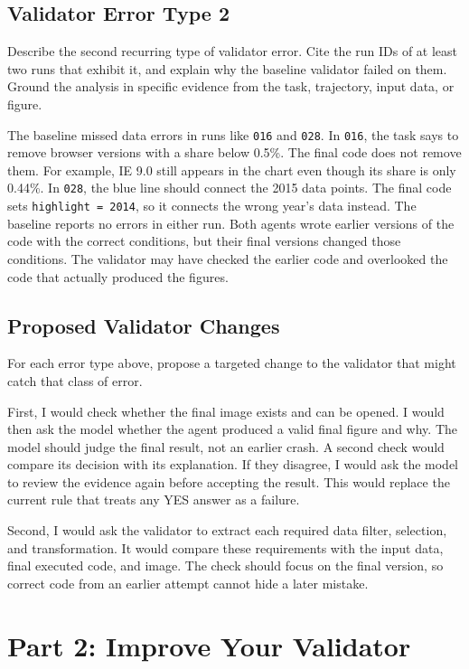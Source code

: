 \documentclass[11pt]{article}
\begin{document}
\subsection{Validator Error Type 2}
Describe the second recurring type of validator error. Cite the run IDs of at
least two runs that exhibit it, and explain why the baseline validator failed
on them. Ground the analysis in specific evidence from the task, trajectory,
input data, or figure.

\medskip
The baseline missed data errors in runs like \texttt{016} and \texttt{028}.
In \texttt{016}, the task says to remove browser versions with a share
below 0.5\%. The final code does not remove them. For example, IE 9.0
still appears in the chart even though its share is only 0.44\%.
In \texttt{028}, the blue line should connect the 2015 data points.
The final code sets \texttt{highlight = 2014}, so it connects the wrong
year's data instead. The baseline reports no errors in either run.
Both agents wrote earlier versions of the code with the correct
conditions, but their final versions changed those conditions.
The validator may have checked the earlier code and overlooked the
code that actually produced the figures.

\subsection{Proposed Validator Changes}
For each error type above, propose a targeted change to the validator that
might catch that class of error.

\medskip
First, I would check whether the final image exists and can be opened. I would
then ask the model whether the agent produced a valid final figure and why.
The model should judge the final result, not an earlier crash. A second check
would compare its decision with its explanation. If they disagree, I would
ask the model to review the evidence again before accepting the result.
This would replace the current rule that treats any YES answer as a failure.

Second, I would ask the validator to extract each required data filter,
selection, and transformation. It would compare these requirements with the
input data, final executed code, and image. The check should focus on the final
version, so correct code from an earlier attempt cannot hide a later mistake.

\section{Part 2: Improve Your Validator}
\end{document}
